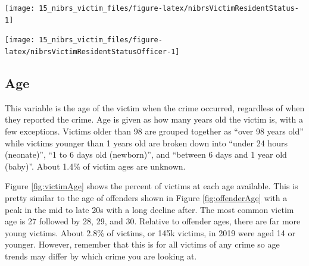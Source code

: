 \documentclass[
]{krantz}
\let\origfigure\figure
\let\endorigfigure\endfigure
\renewenvironment{figure}[1][2] {
    \expandafter\origfigure\expandafter[H]
} {
    \endorigfigure
}
\begin{document}
\begin{figure}

{\centering \texttt{[image: 15\_nibrs\_victim\_files/figure-latex/nibrsVictimResidentStatus-1]} 

}

\caption{The share of victims by resident status in the reporting agency's jurisdiction, 1991-2023.}\label{fig:nibrsVictimResidentStatus}
\end{figure}

\begin{figure}

{\centering \texttt{[image: 15\_nibrs\_victim\_files/figure-latex/nibrsVictimResidentStatusOfficer-1]} 

}

\caption{The share of victims by resident status in the reporting agency's jurisdiction for law enforcement officer victims, 1991-2023.}\label{fig:nibrsVictimResidentStatusOfficer}
\end{figure}

\subsection{Age}\label{age-3}

This variable is the age of the victim when the crime
occurred, regardless of when they reported the crime. Age is
given as how many years old the victim is, with a few
exceptions. Victims older than 98 are grouped together as
``over 98 years old'' while victims younger than 1 years old
are broken down into ``under 24 hours (neonate)'', ``1 to 6
days old (newborn)'', and ``between 6 days and 1 year old
(baby)''. About 1.4\% of victim ages are unknown.

Figure \ref{fig:victimAge} shows the percent of victims at
each age available. This is pretty similar to the age of
offenders shown in Figure \ref{fig:offenderAge} with a peak
in the mid to late 20s with a long decline after. The most
common victim age is 27 followed by 28, 29, and 30. Relative
to offender ages, there are far more young victims. About
2.8\% of victims, or 145k victims, in 2019 were aged 14 or
younger. However, remember that this is for all victims of
any crime so age trends may differ by which crime you are
looking at.
\end{document}
